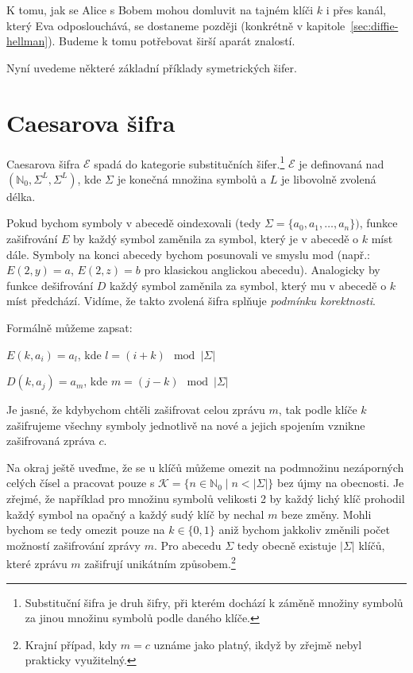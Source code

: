 \documentclass[
  program=infoi,
  biblatex,
  figures=false,
  glossaries,
  index
]{kidiplom}
\begin{document}
    K tomu, jak se Alice s Bobem mohou domluvit na tajném klíči $k$ i přes kanál, který 
    Eva odposlouchává, se dostaneme později (konkrétně v kapitole~\ref{sec:diffie-hellman}).
    Budeme k tomu potřebovat širší aparát znalostí.

    Nyní uvedeme některé základní příklady symetrických šifer.


\section{Caesarova šifra}
    Caesarova šifra $\mathcal{E}$ spadá do kategorie substitučních šifer.\footnote{Substituční šifra je druh šifry, při kterém dochází k záměně
    množiny symbolů za jinou množinu symbolů podle daného klíče.}
    $\mathcal{E}$ je definovaná nad $(\mathbb{N}_0,\Sigma^L,\Sigma^L)$, kde $\Sigma$
    je konečná množina symbolů a $L$ je libovolně zvolená délka.

    Pokud bychom symboly v abecedě oindexovali (tedy $\Sigma = \{a_0, a_1, \ldots, a_n\})$, funkce zašifrování $E$ by každý symbol zaměnila za
    symbol, který je v abecedě o $k$ míst dále. Symboly na konci abecedy bychom posunovali ve smyslu mod
    (např.: $E(2, y)= a$, $E(2, z)= b$ pro klasickou anglickou abecedu). Analogicky by 
    funkce dešifrování $D$ každý symbol zaměnila za symbol, který mu v abecedě o $k$ míst předchází.
    Vidíme, že takto zvolená šifra splňuje \emph{podmínku korektnosti}.

    \medskip

    Formálně můžeme zapsat:

    \begin{center}
        $E(k, a_i) = a_l$, kde $l = (i+k)\mod{|\Sigma|}$

        $D(k, a_j) = a_m$, kde $m = (j-k)\mod{|\Sigma|}$
    \end{center}

    Je jasné, že kdybychom chtěli zašifrovat celou zprávu $m$, tak podle klíče $k$ zašifrujeme všechny symboly jednotlivě na nové a
    jejich spojením vznikne zašifrovaná zpráva $c$.
    
    \bigskip
    Na okraj ještě uveďme, že se u klíčů můžeme omezit na podmnožinu nezáporných celých čísel a pracovat pouze s
    $\mathcal{K} =\{n \in \mathbb{N}_0 \mid n < |\Sigma|\}$
    bez újmy na obecnosti. Je zřejmé, že například pro množinu symbolů velikosti 2 by každý lichý klíč prohodil
    každý symbol na opačný a každý sudý klíč by nechal $m$ beze změny. Mohli bychom se tedy omezit pouze na $k \in \{0,1\}$
    aniž bychom jakkoliv změnili počet možností zašifrování zprávy $m$.
    Pro abecedu $\Sigma$ tedy obecně existuje $|\Sigma|$ klíčů, které zprávu $m$ zašifrují unikátním způsobem.\footnote{Krajní případ, kdy $m = c$
    uznáme jako platný, ikdyž by zřejmě nebyl prakticky využitelný.}
\end{document}
